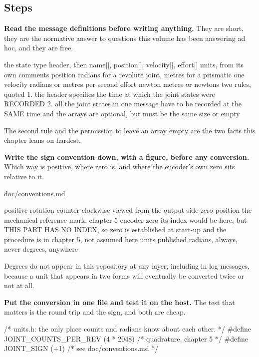 \subsection*{Steps}

\begin{steps}
\item \textbf{Read the message definitions before writing anything.} They are
short, they are the normative answer to questions this volume has been
answering ad hoc, and they are free.
\begin{plaincode}
the state type      header, then name[], position[], velocity[], effort[]
units, from its own comments
  position          radians for a revolute joint, metres for a prismatic one
  velocity          radians or metres per second
  effort            newton metres or newtons
two rules, quoted
  1. the header specifies the time at which the joint states were RECORDED
  2. all the joint states in one message have to be recorded at the SAME time
  and the arrays are optional, but must be the same size or empty
\end{plaincode}
The second rule and the permission to leave an array empty are the two facts
this chapter leans on hardest.

\item \textbf{Write the sign convention down, with a figure, before any
conversion.} Which way is positive, where zero is, and where the encoder's own
zero sits relative to it.
\begin{plaincode}
doc/conventions.md

  positive rotation   counter-clockwise viewed from the output side
  zero position       the mechanical reference mark, chapter 5
  encoder zero        its index would be here, but THIS PART HAS NO INDEX,
                      so zero is established at start-up and the procedure
                      is in chapter 5, not assumed here
  units published     radians, always, never degrees, anywhere
\end{plaincode}
Degrees do not appear in this repository at any layer, including in log
messages, because a unit that appears in two forms will eventually be converted
twice or not at all.

\item \textbf{Put the conversion in one file and test it on the host.} The test
that matters is the round trip and the sign, and both are cheap.
\begin{ccode}
/* units.h: the only place counts and radians know about each other. */
#define JOINT_COUNTS_PER_REV   (4 * 2048)      /* quadrature, chapter 5 */
#define JOINT_SIGN             (+1)            /* see doc/conventions.md */


\end{ccode}
\end{steps}
